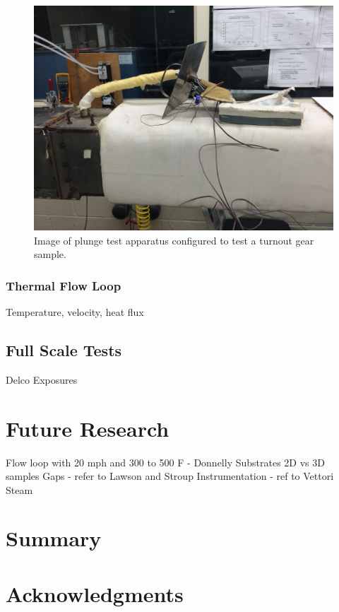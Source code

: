 \documentclass[12pt,oneside]{book}
\begin{document}
\begin{figure}[ht!]
\includegraphics[width=\columnwidth]{../../../Projects/Gear_Plunge_Tests/Pictures/Plunge_2}
\caption{Image of plunge test apparatus configured to test a turnout gear sample.}
\label{fig:plunge_pic}
\end{figure}


\subsection{Thermal Flow Loop}
		Temperature, velocity, heat flux

\section{Full Scale Tests}
	Delco Exposures


\chapter{Future Research}
Flow loop  with 20 mph and 300 to 500 F - Donnelly
Substrates
2D vs 3D samples
Gaps - refer to Lawson and Stroup
Instrumentation - ref to Vettori
Steam

\chapter{Summary}

\chapter{Acknowledgments}



\appendix
\end{document}
